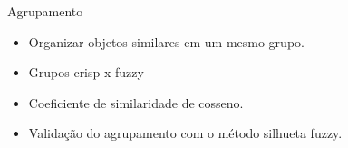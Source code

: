 \documentclass[brazil]{beamer}
\begin{document}
\begin{frame}{Agrupamento}
  \begin{itemize}
    \item<1 -> Organizar objetos similares em um mesmo grupo. 
    \item<2 -> Grupos crisp x fuzzy
    \item<3 -> Coeficiente de similaridade de cosseno.
    \item<4 -> Validação do agrupamento com o método silhueta fuzzy.
  \end{itemize} 
\end{frame}
\end{document}

